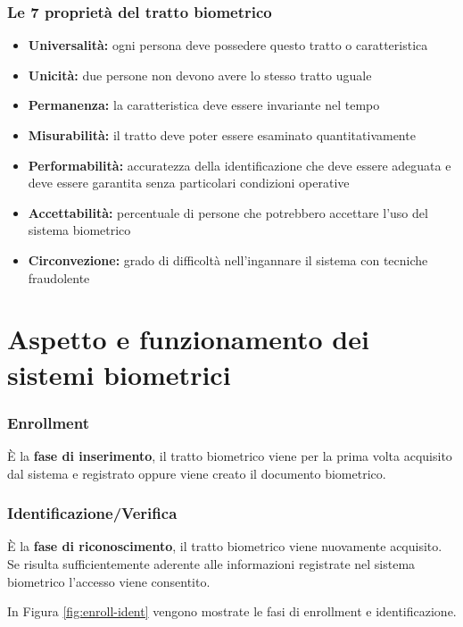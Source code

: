 \subsubsection{Le 7 proprietà del tratto biometrico}

\begin{itemize}
    \item \textbf{Universalità:} ogni persona deve possedere questo tratto o caratteristica
    \item \textbf{Unicità:} due persone non devono avere lo stesso tratto uguale
    \item \textbf{Permanenza:} la caratteristica deve essere invariante nel tempo
    \item \textbf{Misurabilità:} il tratto deve poter essere esaminato quantitativamente
    \item \textbf{Performabilità:} accuratezza della identificazione che deve essere adeguata e deve essere garantita senza particolari condizioni operative
    \item \textbf{Accettabilità:} percentuale di persone che potrebbero accettare l'uso del sistema biometrico
    \item \textbf{Circonvezione:} grado di difficoltà nell'ingannare il sistema con tecniche fraudolente
\end{itemize}

\section{Aspetto e funzionamento dei sistemi biometrici}

\subsubsection{Enrollment}

È la \textbf{fase di inserimento}, il tratto biometrico viene per la prima volta acquisito dal sistema e registrato oppure viene creato il documento biometrico.

\subsubsection{Identificazione/Verifica}

È la \textbf{fase di riconoscimento}, il tratto biometrico viene nuovamente acquisito. Se risulta sufficientemente aderente alle informazioni registrate nel sistema biometrico l'accesso viene consentito.

\noindent In Figura \ref{fig:enroll-ident} vengono mostrate le fasi di enrollment e identificazione.

